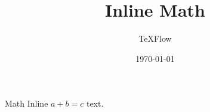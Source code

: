 \documentclass[aspectratio=43]{beamer}
\title{Inline Math}
\author{TeXFlow}
\date{\today}
\begin{document}
\begin{frame}{Math}
Inline $a+b=c$ text.
\end{frame}
\end{document}
